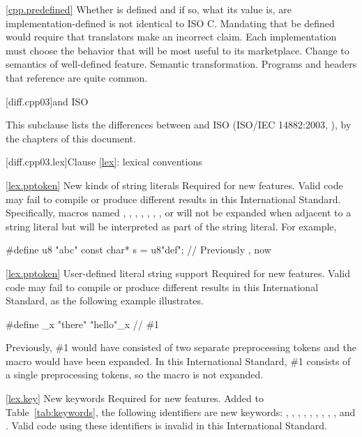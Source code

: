 \ref{cpp.predefined}
\change Whether  is defined and if so, what its value is, are
implementation-defined
\rationale
\Cpp is not identical to ISO C\@.
Mandating that 
be defined would require that translators make an incorrect claim.
Each implementation must choose the behavior that will be most
useful to its marketplace.
\effect
Change to semantics of well-defined feature.
\difficulty
Semantic transformation.
\howwide
Programs and headers that reference  are
quite common.

[diff.cpp03]{\Cpp and ISO \CppIII}

\pnum
{}%
This subclause lists the differences between \Cpp and
ISO \CppIII (ISO/IEC 14882:2003, ),
by the chapters of this document.

[diff.cpp03.lex]{Clause \ref{lex}: lexical conventions}

\ref{lex.pptoken}
\change New kinds of string literals
\rationale Required for new features.
\effect
Valid \CppIII code may fail to compile or produce different results in
this International Standard. Specifically, macros named , ,
, , , , , or  will
not be expanded when adjacent to a string literal but will be interpreted as
part of the string literal. For example,

\begin{codeblock}
#define u8 "abc"
const char* s = u8"def";        // Previously , now 
\end{codeblock}

\ref{lex.pptoken}
\change User-defined literal string support
\rationale Required for new features.
\effect
Valid \CppIII code may fail to compile or produce different results in
this International Standard, as the following example illustrates.

\begin{codeblock}
#define _x "there"
"hello"_x         // \#1
\end{codeblock}

Previously, \#1 would have consisted of two separate preprocessing tokens and
the macro  would have been expanded. In this International Standard,
\#1 consists of a single preprocessing tokens, so the macro is not expanded.

\ref{lex.key}
\change New keywords
\rationale Required for new features.
\effect
Added to Table~\ref{tab:keywords}, the following identifiers are new keywords:
,
,
,
,
,
,
,
,
,
and
.
Valid \CppIII code using these identifiers is invalid in this International
Standard.

